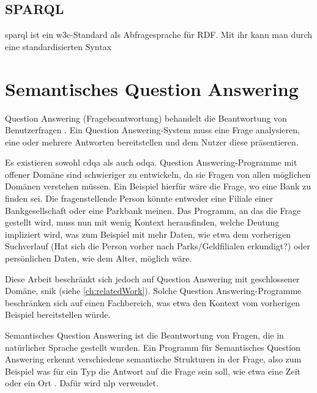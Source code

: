 \subsection{SPARQL}

\ac{sparql} ist ein \ac{w3c}-Standard als Abfragesprache für RDF.
Mit ihr kann man durch eine standardisierten Syntax

\section{Semantisches Question Answering}

\begin{definition}
Question Answering (Fragebeantwortung) behandelt die Beantwortung von Benutzerfragen \citep{qadefinition}.
Ein Question Answering-System muss eine Frage analysieren, eine oder mehrere Antworten bereitstellen und dem Nutzer diese präsentieren.
\end{definition}

Es existieren sowohl \ac{cdqa} als auch \ac{odqa}.
Question Answering-Programme mit offener Domäne sind schwieriger zu entwickeln,
da sie Fragen von allen möglichen Domänen verstehen müssen.
Ein Beispiel hierfür wäre die Frage, wo eine Bank zu finden sei.
Die fragenstellende Person könnte entweder eine Filiale einer Bankgesellschaft oder eine Parkbank meinen.
Das Programm, an das die Frage gestellt wird, muss nun mit wenig Kontext herausfinden,
welche Deutung impliziert wird, was zum Beispiel mit mehr Daten,
wie etwa dem vorherigen Suchverlauf (Hat sich die Person vorher nach Parks/Geldfilialen erkundigt?)
oder persönlichen Daten, wie dem Alter, möglich wäre.

Diese Arbeit beschränkt sich jedoch auf Question Answering mit geschlossener Domäne, \ac{snik} (siehe \cref{ch:relatedWork}).
Solche Question Answering-Programme beschränken sich auf einen Fachbereich,
was etwa den Kontext vom vorherigen Beispiel bereitstellen würde.

\begin{definition}
Semantisches Question Answering ist die Beantwortung von Fragen, die in natürlicher Sprache gestellt wurden.
Ein Programm für Semantisches Question Answering erkennt verschiedene semantische Strukturen in der Frage,
also zum Beispiel was für ein Typ die Antwort auf die Frage sein soll, wie etwa eine Zeit oder ein Ort \citep{sqadefinition}.
Dafür wird \acs{nlp} verwendet.
\end{definition}

